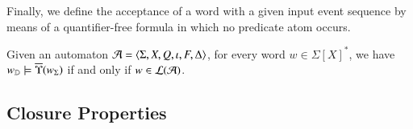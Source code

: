 
Finally, we define the acceptance of a word with a given input event
sequence by means of a quantifier-free formula in which no predicate
atom occurs.

\begin{lemma}\label{lemma:quant-pred-acceptance}
  Given an automaton $\mathcal{A} = \langle \Sigma,X,Q,\iota,F,\Delta \rangle$, for
  every word $w \in \Sigma[X]^*$, we have ${w}_{\mathbb{D}} \models
  \overline{\Upsilon}({{w}_\Sigma})$ if and only if $w \in {\mathcal L}({\mathcal{A}})$.
\end{lemma}

\subsection{Closure Properties}
\label{sec:closure}


